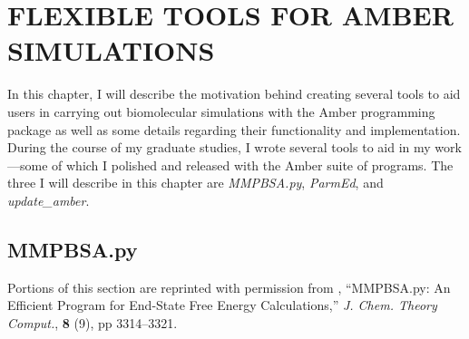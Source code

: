 \chapter{FLEXIBLE TOOLS FOR AMBER SIMULATIONS}
\label{ch6}

In this chapter, I will describe the motivation behind creating several tools
to aid users in carrying out biomolecular simulations with the Amber programming
package as well as some details regarding their functionality and
implementation. During the course of my graduate studies, I wrote several tools
to aid in my work---some of which I polished and released with the Amber suite
of programs. The three I will describe in this chapter are \emph{MMPBSA.py},
\cite{MMPBSApy} \emph{ParmEd}, and \emph{update\_amber}.

\section{MMPBSA.py}

Portions of this section are reprinted with permission from
\citeauthor{MMPBSApy}, ``MMPBSA.py: An Efficient Program for End-State Free
Energy Calculations,'' \emph{J. Chem. Theory Comput.}, \textbf{8} (9), pp
3314--3321. \cite{MMPBSApy}


